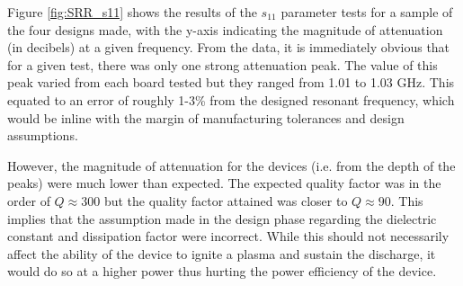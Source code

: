 Figure \ref{fig:SRR_s11} shows the results of the $s_{11}$ parameter tests for a sample of the four designs made, with the y-axis indicating the magnitude of attenuation (in decibels) at a given frequency. From the data, it is immediately obvious that for a given test, there was only one strong attenuation peak. The value of this peak varied from each board tested but they ranged from 1.01 to 1.03 GHz. This equated to an error of roughly 1-3\% from the designed resonant frequency, which would be inline with the margin of manufacturing tolerances and design assumptions. 

However, the magnitude of attenuation for the devices (i.e. from the depth of the peaks) were much lower than expected. The expected quality factor was in the order of $Q \approx 300$ but the quality factor attained was closer to $Q \approx 90$. This implies that the assumption made in the design phase regarding the dielectric constant and dissipation factor were incorrect. While this should not necessarily affect the ability of the device to ignite a plasma and sustain the discharge, it would do so at a higher power thus hurting the power efficiency of the device.




%

